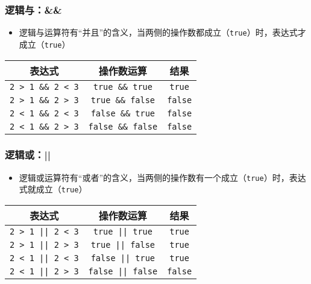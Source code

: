 \begin{frame}[fragile]
    \frametitle{逻辑与：\&\&}

    \begin{itemize}
        \item 逻辑与运算符有“并且”的含义，当两侧的操作数都成立（\lstinline|true|）时，表达式才成立（\lstinline|true|）
    \end{itemize}

    \begin{table}[]
        \begin{tabular}{ccc}
            \toprule
            表达式                     & 操作数运算                 & 结果              \\
            \midrule
            \lstinline|2 > 1 && 2 < 3| & \lstinline|true && true|   & \lstinline|true|  \\
            \lstinline|2 > 1 && 2 > 3| & \lstinline|true && false|  & \lstinline|false| \\
            \lstinline|2 < 1 && 2 < 3| & \lstinline|false && true|  & \lstinline|false| \\
            \lstinline|2 < 1 && 2 > 3| & \lstinline|false && false| & \lstinline|false| \\
            \bottomrule
        \end{tabular}
    \end{table}
\end{frame}

\begin{frame}[fragile]
    \frametitle{逻辑或：||}

    \begin{itemize}
        \item 逻辑或运算符有“或者”的含义，当两侧的操作数有一个成立（\lstinline|true|）时，表达式就成立（\lstinline|true|） 
    \end{itemize}

    \begin{table}[]
        \begin{tabular}{ccc}
            \toprule
            表达式                     & 操作数运算                 & 结果              \\
            \midrule
            \lstinline!2 > 1 || 2 < 3! & \lstinline!true || true!   & \lstinline!true!  \\
            \lstinline!2 > 1 || 2 > 3! & \lstinline!true || false!  & \lstinline!true!  \\
            \lstinline!2 < 1 || 2 < 3! & \lstinline!false || true!  & \lstinline!true!  \\
            \lstinline!2 < 1 || 2 > 3! & \lstinline!false || false! & \lstinline!false! \\
            \bottomrule
        \end{tabular}
    \end{table}
\end{frame}

